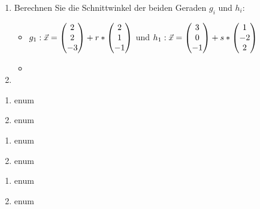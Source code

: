 \begin{enumerate}
	\item Berechnen Sie die Schnittwinkel der beiden Geraden $g_i$ und $h_i$:
	\begin{itemize}
		\item $g_1: \vec x = \begin{pmatrix} 2\\2\\-3 \end{pmatrix} + r*\begin{pmatrix} 2\\1\\-1 \end{pmatrix}$ und $h_1: \vec x = \begin{pmatrix} 3\\0\\-1 \end{pmatrix} + s* \begin{pmatrix} 1\\-2\\2 \end{pmatrix}$
		\item
	\end{itemize}
	\item
\end{enumerate}

\begin{enumerate}
	\item enum
	\item	enum
\end{enumerate}

\begin{enumerate}
	\item enum
	\item	enum
\end{enumerate}


\begin{enumerate}
	\item enum
	\item	enum
\end{enumerate}


